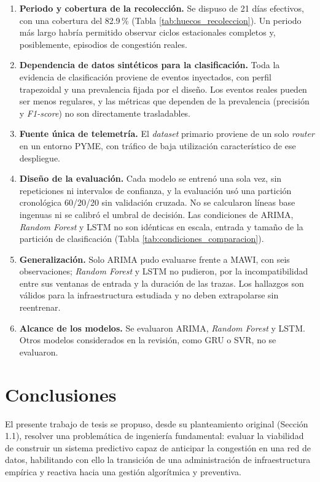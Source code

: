 \documentclass[12pt]{report}
\begin{document}
\begin{enumerate}
    \item \textbf{Periodo y cobertura de la recolección.} Se dispuso de 21 días efectivos, con una cobertura del 82.9\,\% (Tabla \ref{tab:huecos_recoleccion}). Un periodo más largo habría permitido observar ciclos estacionales completos y, posiblemente, episodios de congestión reales.
    \item \textbf{Dependencia de datos sintéticos para la clasificación.} Toda la evidencia de clasificación proviene de eventos inyectados, con perfil trapezoidal y una prevalencia fijada por el diseño. Los eventos reales pueden ser menos regulares, y las métricas que dependen de la prevalencia (precisión y \textit{F1-score}) no son directamente trasladables.
    \item \textbf{Fuente única de telemetría.} El \textit{dataset} primario proviene de un solo \textit{router} en un entorno PYME, con tráfico de baja utilización característico de ese despliegue.
    \item \textbf{Diseño de la evaluación.} Cada modelo se entrenó una sola vez, sin repeticiones ni intervalos de confianza, y la evaluación usó una partición cronológica 60/20/20 sin validación cruzada. No se calcularon líneas base ingenuas ni se calibró el umbral de decisión. Las condiciones de ARIMA, \textit{Random Forest} y LSTM no son idénticas en escala, entrada y tamaño de la partición de clasificación (Tabla \ref{tab:condiciones_comparacion}).
    \item \textbf{Generalización.} Solo ARIMA pudo evaluarse frente a MAWI, con seis observaciones; \textit{Random Forest} y LSTM no pudieron, por la incompatibilidad entre sus ventanas de entrada y la duración de las trazas. Los hallazgos son válidos para la infraestructura estudiada y no deben extrapolarse sin reentrenar.
    \item \textbf{Alcance de los modelos.} Se evaluaron ARIMA, \textit{Random Forest} y LSTM. Otros modelos considerados en la revisión, como GRU o SVR, no se evaluaron.
\end{enumerate}

\chapter{Conclusiones}
\label{cap:conclusiones}

El presente trabajo de tesis se propuso, desde su planteamiento original (Sección 1.1), resolver una problemática de ingeniería fundamental: evaluar la viabilidad de construir un sistema predictivo capaz de anticipar la congestión en una red de datos, habilitando con ello la transición de una administración de infraestructura empírica y reactiva hacia una gestión algorítmica y preventiva. 
\end{document}

